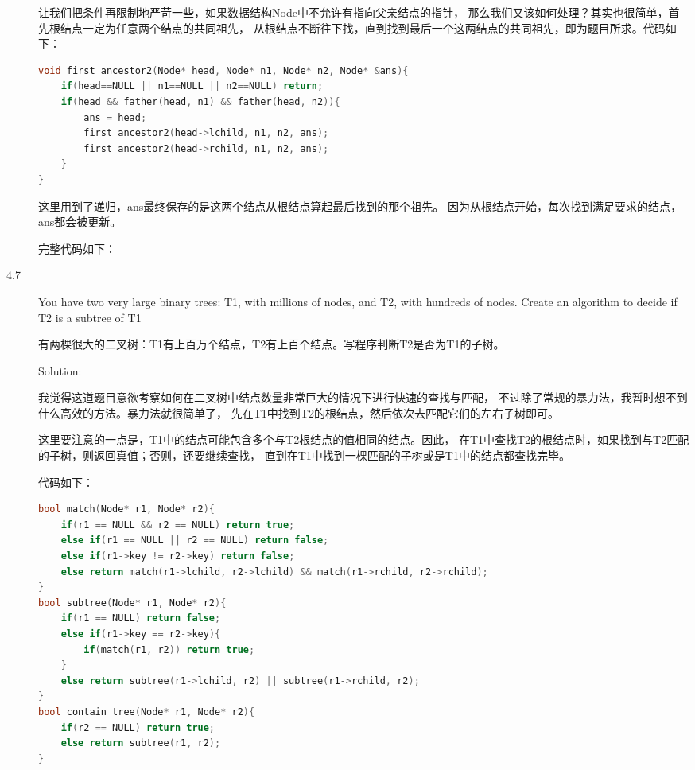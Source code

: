 \begin{description}
让我们把条件再限制地严苛一些，如果数据结构Node中不允许有指向父亲结点的指针， 那么我们又该如何处理？其实也很简单，首先根结点一定为任意两个结点的共同祖先， 从根结点不断往下找，直到找到最后一个这两结点的共同祖先，即为题目所求。代码如下：

\begin{lstlisting}[language=C++]
void first_ancestor2(Node* head, Node* n1, Node* n2, Node* &ans){
    if(head==NULL || n1==NULL || n2==NULL) return;
    if(head && father(head, n1) && father(head, n2)){
        ans = head;
        first_ancestor2(head->lchild, n1, n2, ans);
        first_ancestor2(head->rchild, n1, n2, ans);
    }
}
\end{lstlisting}

这里用到了递归，ans最终保存的是这两个结点从根结点算起最后找到的那个祖先。 因为从根结点开始，每次找到满足要求的结点，ans都会被更新。

完整代码如下：




\item[4.7] You have two very large binary trees: T1, with millions of nodes, and T2, with hundreds of nodes. Create an algorithm to decide if T2 is a subtree of T1

有两棵很大的二叉树：T1有上百万个结点，T2有上百个结点。写程序判断T2是否为T1的子树。

Solution: 

我觉得这道题目意欲考察如何在二叉树中结点数量非常巨大的情况下进行快速的查找与匹配， 不过除了常规的暴力法，我暂时想不到什么高效的方法。暴力法就很简单了， 先在T1中找到T2的根结点，然后依次去匹配它们的左右子树即可。

这里要注意的一点是，T1中的结点可能包含多个与T2根结点的值相同的结点。因此， 在T1中查找T2的根结点时，如果找到与T2匹配的子树，则返回真值；否则，还要继续查找， 直到在T1中找到一棵匹配的子树或是T1中的结点都查找完毕。

代码如下：
\begin{lstlisting}[language=C++]
bool match(Node* r1, Node* r2){
    if(r1 == NULL && r2 == NULL) return true;
    else if(r1 == NULL || r2 == NULL) return false;
    else if(r1->key != r2->key) return false;
    else return match(r1->lchild, r2->lchild) && match(r1->rchild, r2->rchild);
}
bool subtree(Node* r1, Node* r2){
    if(r1 == NULL) return false;
    else if(r1->key == r2->key){
        if(match(r1, r2)) return true;
    }
    else return subtree(r1->lchild, r2) || subtree(r1->rchild, r2);
}
bool contain_tree(Node* r1, Node* r2){
    if(r2 == NULL) return true;
    else return subtree(r1, r2);
}
\end{lstlisting}


\end{description}
